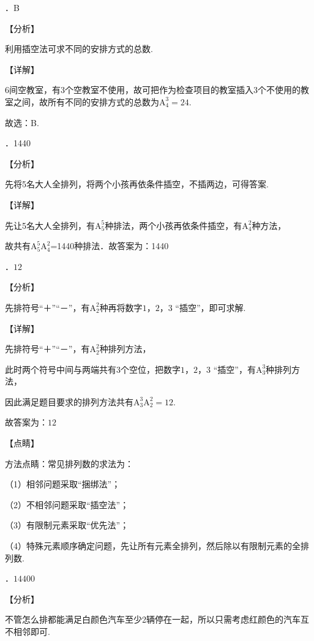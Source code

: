 ．B

\noindent 【分析】

\noindent 利用插空法可求不同的安排方式的总数.

\noindent 【详解】

\noindent 6间空教室，有3个空教室不使用，故可把作为检查项目的教室插入3个不使用的教室之间，故所有不同的安排方式的总数为$\mathrm A_{4}^{3} =24$.

\noindent 故选：B.

．1440

\noindent 【分析】

\noindent 先将5名大人全排列，将两个小孩再依条件插空，不插两边，可得答案.

\noindent 【详解】

\noindent 先让5名大人全排列，有$\mathrm A_{5}^{5} $种排法，两个小孩再依条件插空，有$\mathrm A_{4}^{2} $种方法，

\noindent 故共有$\mathrm A_{5}^{5} \mathrm A_{4}^{2} $=1440种排法．故答案为：1440

．$12$

\noindent 【分析】

\noindent 先排符号``＋''``－''，有$\mathrm A_{2}^{2} $种再将数字$1$，$2$，$3$ ``插空''，即可求解.

\noindent 【详解】

\noindent 先排符号``＋''``－''，有$\mathrm A_{2}^{2} $种排列方法，

\noindent 此时两个符号中间与两端共有$3$个空位，把数字$1$，$2$，$3$ ``插空''，有$\mathrm A_{3}^{3} $种排列方法，

\noindent 因此满足题目要求的排列方法共有$\mathrm A_{3}^{3} \mathrm A_{2}^{2} =12$.

\noindent 故答案为：$12$

\noindent 【点睛】

\noindent 方法点睛：常见排列数的求法为：

\noindent （1）相邻问题采取``捆绑法''；

\noindent （2）不相邻问题采取``插空法''；

\noindent （3）有限制元素采取``优先法''；

\noindent （4）特殊元素顺序确定问题，先让所有元素全排列，然后除以有限制元素的全排列数.

．$14400$

\noindent 【分析】

\noindent 不管怎么排都能满足白颜色汽车至少2辆停在一起，所以只需考虑红颜色的汽车互不相邻即可.

